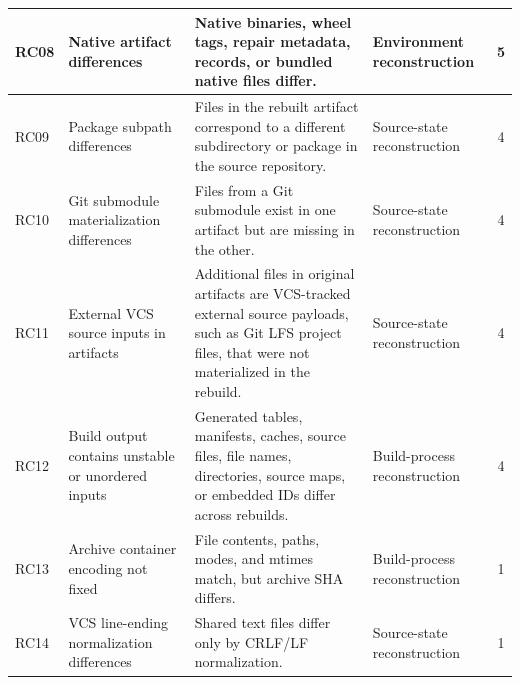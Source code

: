 \begin{table}[t]
\begin{tabularx}{\textwidth}{@{}p{} p{} Y p{0.18\textwidth} c@{}}
\midrule
RC08 & Native artifact differences & Native binaries, wheel tags, repair metadata, records, or bundled native files differ. & Environment reconstruction & 5 \\
\midrule
RC09 & Package subpath differences & Files in the rebuilt artifact correspond to a different subdirectory or package in the source repository. & Source-state reconstruction & 4 \\
\midrule
RC10 & Git submodule materialization differences & Files from a Git submodule exist in one artifact but are missing in the other. & Source-state reconstruction & 4 \\
\midrule
RC11 & External VCS source inputs in artifacts & Additional files in original artifacts are VCS-tracked external source payloads, such as Git LFS project files, that were not materialized in the rebuild. & Source-state reconstruction & 4 \\
\midrule
RC12 & Build output contains unstable or unordered inputs & Generated tables, manifests, caches, source files, file names, directories, source maps, or embedded IDs differ across rebuilds. & Build-process reconstruction & 4 \\
\midrule
RC13 & Archive container encoding not fixed & File contents, paths, modes, and mtimes match, but archive SHA differs. & Build-process reconstruction & 1 \\
\midrule
RC14 & VCS line-ending normalization differences & Shared text files differ only by CRLF/LF normalization. & Source-state reconstruction & 1 \\
\bottomrule
\end{tabularx}
\end{table}



